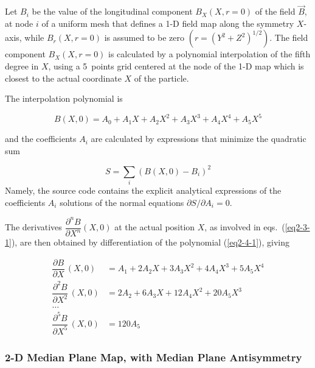  Let $ B_i $ be the value of the longitudinal component $ B_X(X,r=0)$ of the 
field $ \vec  B$, at  node $ i $ of a uniform mesh that defines a 1-D
field map along the symmetry $ X$-axis, while $ B_r(X,r=0) $ is assumed to be zero 
$(r=(Y^2+Z^2)^{1/2})$. The field component $B_X(X,r=0) $ 
is calculated by a polynomial interpolation of the fifth degree in $ X$,  
using a 5~points grid centered at the node of the 1-D map which is closest 
to the actual coordinate $ X $ of the particle. 

\noindent The interpolation polynomial is

 \begin{equation}
	 B(X,0)=A_0 + A_1 X + A_2 X^2 + A_3 X^3 + A_4 X^4 + A_5 X^5 
 	\label{eq2-4-1}
 \end{equation}
 
and the coefficients $ A_i $ are calculated by expressions that
minimize the quadratic sum

\medskip

 \begin{equation}
     S = \sum_i \left(B(X,0)-B_i \right)^2  
 	\label{eq2-4-2}
 \end{equation}
%
\noindent Namely, the source code contains the explicit analytical 
expressions of the coefficients $A_i$ solutions of the normal 
equations $\partial S / \partial A_i = 0$.

\noindent The derivatives $  \dfrac{ \partial^n B }{ \partial X^n}
(X,0) $ at the actual position $ X$,  as involved 
in eqs.~(\ref{eq2-3-1}), are then obtained by differentiation of the polynomial 
(\ref{eq2-4-1}), giving

\begin{equation}
	\begin{aligned}
		\dfrac{ \partial B }{ \partial X}\, (X,0) 
		  &  =  A_1 + 2 A_2 X + 3 A_3 X^2 + 4 A_4 X^3 + 5 A_5 X^4 \\
		\dfrac{\partial^2 B }{ \partial X^2}\, (X,0)  
		  & = 2 A_2 + 6 A_3 X + 12 A_4 X^2 + 20 A_5 X^3 \\
		\ldots & \\
		 \dfrac{\partial^5 B }{ \partial X^5}\, (X,0) 
		  & = 120 A_5 
	\end{aligned}
	\label{eq2-4-3}
\end{equation}

  
\subsubsection{2-D Median Plane Map, with Median Plane Antisymmetry} \label{sec2.4.2}

